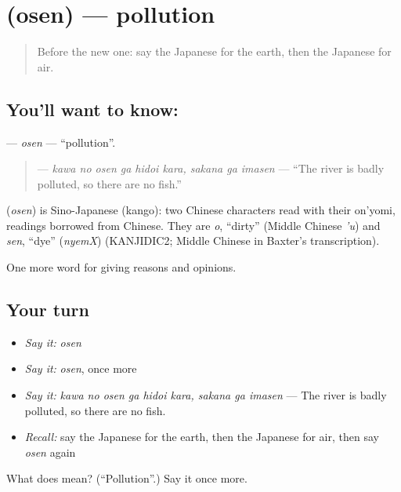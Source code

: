 \section[\texorpdfstring{\ja{おせん} (osen)}{おせん (osen)}]{ (osen) — pollution}

\label{lesson:JA-C336-osen}



\begin{quote}
Before the new one: say the Japanese for the earth, then the Japanese for air.
\end{quote}

\subsection*{You'll want to know: }
\textbf{} — \emph{osen} — \textquotedblleft{}pollution\textquotedblright{}.

\begin{quote}
\textbf{   } — \emph{kawa no osen ga hidoi kara, sakana ga imasen} — \textquotedblleft{}The river is badly polluted, so there are no fish.\textquotedblright{}
\end{quote}

\begin{cousinweb}
\textbf{} (\emph{osen}) is Sino-Japanese (kango): two Chinese characters read with their on'yomi, readings borrowed from Chinese. They are \emph{o}, \textquotedblleft{}dirty\textquotedblright{} (Middle Chinese \emph{'u}) and \emph{sen}, \textquotedblleft{}dye\textquotedblright{} (\emph{nyemX}) (KANJIDIC2; Middle Chinese in Baxter's transcription).
\end{cousinweb}

\begin{grammarlens}[title={What you've built}]
One more word for giving reasons and opinions.
\end{grammarlens}

\subsection*{Your turn}
\begin{itemize}
\raggedright
  \item \emph{Say it:} \emph{osen}
  \item \emph{Say it:} \emph{osen}, once more
  \item \emph{Say it:} \emph{kawa no osen ga hidoi kara, sakana ga imasen} — The river is badly polluted, so there are no fish.
  \item \emph{Recall:} say the Japanese for the earth, then the Japanese for air, then say \emph{osen} again
\end{itemize}

\begin{tcolorbox}[breakable,colback=teal!4,colframe=teal!35!black,title={Before you move on}]
What does  mean? (\textquotedblleft{}Pollution\textquotedblright{}.) Say it once more.
\end{tcolorbox}
